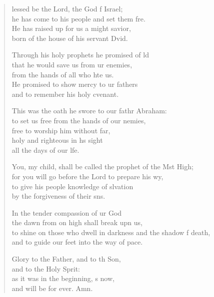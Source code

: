\begin{verse}
  \begin{patverse}
lessed be the Lord, the God f Israel;\Med\\
he has come to his people and set them fre.\\
He has raised up for us a might savior,\Med\\
born of the house of his servant Dvid.

Through his holy prophets he promised of ld\Flex\\
that he would save us from ur enemies,\Med\\
from the hands of all who hte us.\\
He promised to show mercy to ur fathers\Med\\
and to remember his holy cvenant.

This was the oath he swore to our fathr Abraham:\Med\\
to set us free from the hands of our nemies,\\
free to worship him without far,\Flex\\
holy and righteous in h\pointup{\i}s sight\Med\\
all the days of our l\pointup{\i}fe.

You, my child, shall be called the prophet of the Mst High;\Med\\
for you will go before the Lord to prepare his wy,\\
to give his people knowledge of slvation\Med\\
by the forgiveness of their s\pointup{\i}ns.

In the tender compassion of ur God\Med\\
the dawn from on high shall break upn us,\\
to shine on those who dwell in darkness and the shadow f death,\Med\\
and to guide our feet into the way of pace.

Glory to the Father, and to th Son,\Med\\
and to the Holy Sp\pointup{\i}rit:\\
as it was in the beginning, \pointup{\i}s now,\Med\\
and will be for ever. Amn.
  \end{patverse}
  \end{verse}
